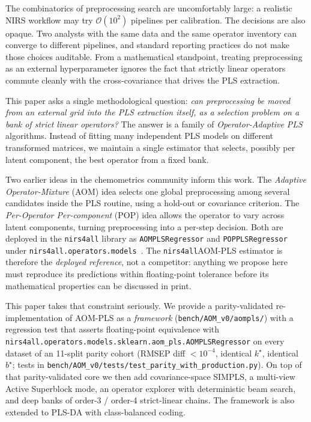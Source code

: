 \documentclass[review,a4paper]{elsarticle}
\newcommand{\AOM}{\textsc{AOM}\xspace}
\newcommand{\POP}{\textsc{POP}\xspace}
\newcommand{\PLS}{\textsc{PLS}\xspace}
\newcommand{\PLSDA}{\textsc{PLS-DA}\xspace}
\newcommand{\SIMPLS}{\textsc{SIMPLS}\xspace}
\newcommand{\nirsfourall}{\texttt{nirs4all}\xspace}
\begin{document}
The combinatorics of preprocessing search are uncomfortably large: a
realistic NIRS workflow may try $\mathcal{O}(10^2)$ pipelines per
calibration. The decisions are also opaque. Two analysts with the same
data and the same operator inventory can converge to different
pipelines, and standard reporting practices do not make those choices
auditable. From a mathematical standpoint, treating preprocessing as an
external hyper\-parameter ignores the fact that strictly linear
operators commute cleanly with the cross-covariance that drives the
\PLS extraction.

This paper asks a single methodological question: \emph{can preprocessing
be moved from an external grid into the \PLS extraction itself, as a
selection problem on a bank of strict linear operators?} The answer is
a family of \emph{Operator-Adaptive \PLS} algorithms. Instead of fitting
many independent \PLS models on different transformed matrices, we
maintain a single estimator that selects, possibly per latent
component, the best operator from a fixed bank.

Two earlier ideas in the chemometrics community inform this work. The
\emph{Adaptive Operator-Mixture} (\AOM) idea selects one global
preprocessing among several candidates inside the \PLS routine, using a
hold-out or covariance criterion. The \emph{Per-Operator Per-component}
(\POP) idea allows the operator to vary across latent components,
turning preprocessing into a per-step decision. Both are deployed in the
\nirsfourall library as \verb|AOMPLSRegressor| and \verb|POPPLSRegressor|
under \verb|nirs4all.operators.models|~\cite{aompls2025prior, nirs4all2025}.
The \nirsfourall \AOM-\PLS estimator is therefore the
\emph{deployed reference}, not a competitor: anything we propose here
must reproduce its predictions within floating-point tolerance before its mathematical
properties can be discussed in print.

This paper takes that constraint seriously. We provide a parity-validated
re-implementation of \AOM-\PLS as a \emph{framework} (\verb|bench/AOM_v0/aompls/|)
with a regression test that asserts floating-point equivalence with
\verb|nirs4all.operators.models.sklearn.aom_pls.AOMPLSRegressor|
on every dataset of an 11-split parity cohort (RMSEP diff $<10^{-4}$,
identical $k^\star$, identical $b^\star$; tests in
\verb|bench/AOM_v0/tests/test_parity_with_production.py|). On top of
that parity-validated core we then add covariance-space \SIMPLS, a
multi-view Active Superblock mode, an operator explorer with deterministic
beam search, and deep banks of order-3 / order-4 strict-linear chains.
The framework is also extended to \PLSDA with class-balanced coding.
\end{document}
